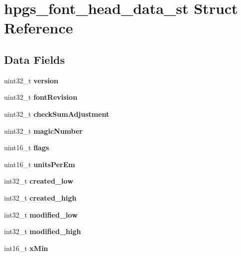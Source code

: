 \section{hpgs\_\-font\_\-head\_\-data\_\-st Struct Reference}
\label{structhpgs__font__head__data__st}
\subsection*{Data Fields}
\begin{DoxyCompactItemize}
\item 
uint32\_\-t {\bfseries version}\label{structhpgs__font__head__data__st_aa9eeec630667545a5ba41fa72f3ad518}

\item 
uint32\_\-t {\bfseries fontRevision}\label{structhpgs__font__head__data__st_a747620a0549e29a108aa7b1a54da85e7}

\item 
uint32\_\-t {\bfseries checkSumAdjustment}\label{structhpgs__font__head__data__st_aed6ce55448501aedf15003b1d3f40489}

\item 
uint32\_\-t {\bfseries magicNumber}\label{structhpgs__font__head__data__st_ab4bd53278b94fb5f4727065ac543accd}

\item 
uint16\_\-t {\bfseries flags}\label{structhpgs__font__head__data__st_a61bb614d8ba4d9325a07ecbc39080929}

\item 
uint16\_\-t {\bfseries unitsPerEm}\label{structhpgs__font__head__data__st_a0d2dd9bb1a04e5c3cd78777ee6284265}

\item 
int32\_\-t {\bfseries created\_\-low}\label{structhpgs__font__head__data__st_a6bbf11671713b99e62973b1cef419a9a}

\item 
int32\_\-t {\bfseries created\_\-high}\label{structhpgs__font__head__data__st_a56f0c692f269002c94dc1cb24758c62f}

\item 
int32\_\-t {\bfseries modified\_\-low}\label{structhpgs__font__head__data__st_abe18d43e8daff876c1588fba4c70489b}

\item 
int32\_\-t {\bfseries modified\_\-high}\label{structhpgs__font__head__data__st_a47cb6b710b7bc8ea65a07be5b3fe97ad}

\item 
int16\_\-t {\bfseries xMin}\label{structhpgs__font__head__data__st_a4e654f2e60bd3cf4773ca26eea497017}


\end{DoxyCompactItemize}
